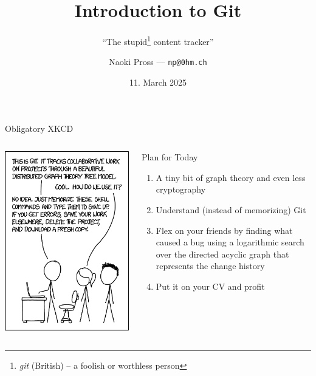 \documentclass[xetex]{beamer}
\title{
  Introduction to Git
}
\subtitle{
  ``The stupid\footnote{
    \emph{git} (British) -- a foolish or worthless person}
  content tracker''
}
\author{
  Naoki Pross --- \texttt{np@0hm.ch}
}
\institute{}
\date{11. March 2025}
\begin{document}
\frame{\titlepage}

\begin{frame}{Obligatory XKCD}
  \begin{columns}
    \begin{column}{.5\linewidth}
      \includegraphics[width=\linewidth]{pic/xkcd1597}
    \end{column}
    \begin{column}{.5\linewidth}
      \begin{alertblock}{Plan for Today}
        \begin{enumerate}
          \item A tiny bit of graph theory and even less cryptography
          \item Understand (instead of memorizing) Git
          \item Flex on your friends by finding what caused a bug using a
            logarithmic search over the directed acyclic graph that represents
            the change history
          \item Put it on your CV and profit
        \end{enumerate}
      \end{alertblock}
    \end{column}
  \end{columns}
\end{frame}
\end{document}
